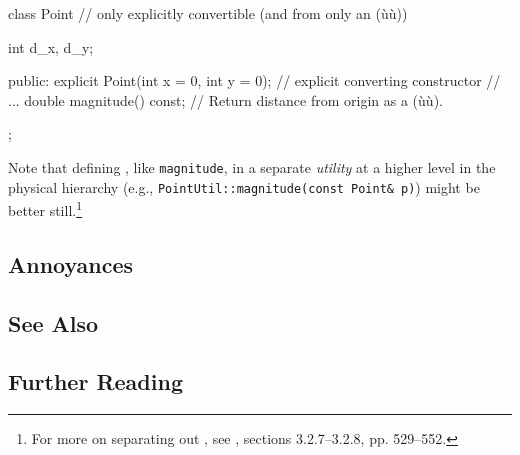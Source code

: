 \begin{emcppslisting}
class Point  // only explicitly convertible (and from only an (ù{}ù))
{
    int d_x, d_y;

public:
    explicit Point(int x = 0, int y = 0);  // explicit converting constructor
    // ...
    double magnitude() const;  // Return distance from origin as a (ù{}ù).
};
\end{emcppslisting}

\noindent Note that defining , like
\lstinline!magnitude!, in a separate \emph{utility} at a higher level in the
physical hierarchy (e.g., \lstinline!PointUtil::magnitude(const!~\lstinline!Point&!~\lstinline!p)!) might be better still.{\cprotect\footnote{For more on
separating out , see
  \cite{lakos20}, sections 3.2.7--3.2.8, pp. 529--552.}}

\subsection[Annoyances]{Annoyances}\label{annoyances}

\hspace{\fill}

\subsection[See Also]{See Also}\label{see-also}

\hspace{\fill}

\subsection[Further Reading]{Further Reading}\label{further-reading}

\hspace{\fill}

